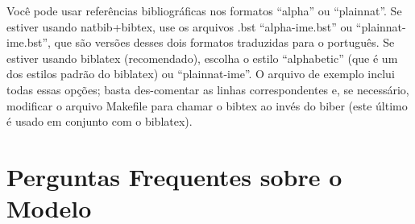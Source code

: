 Você pode usar referências bibliográficas nos formatos ``alpha'' ou ``plainnat''.
Se estiver usando natbib+bibtex, use os arquivos .bst
``alpha-ime.bst'' ou ``plainnat-ime.bst'', que são versões desses dois formatos
traduzidas para o português. Se estiver usando biblatex
(recomendado), escolha o estilo ``alphabetic'' (que é um dos estilos padrão do
biblatex) ou ``plainnat-ime''. O arquivo de exemplo inclui todas essas opções;
basta des-comentar as linhas correspondentes e, se necessário, modificar o
arquivo Makefile para chamar o bibtex ao invés do
biber (este último é usado em conjunto com o biblatex).

\section{Perguntas Frequentes sobre o Modelo}


